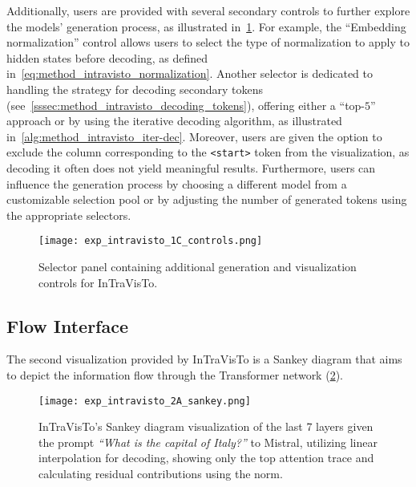 Additionally, users are provided with several secondary controls to further explore the models' generation process, as illustrated in~\cref{fig:exp_intravisto_1_C}.
For example, the ``Embedding normalization'' control allows users to select the type of normalization to apply to hidden states before decoding, as defined in~\cref{eq:method_intravisto_normalization}.
Another selector is dedicated to handling the strategy for decoding secondary tokens (see~\cref{sssec:method_intravisto_decoding_tokens}), offering either a ``top-$5$'' approach or by using the iterative decoding algorithm, as illustrated in~\cref{alg:method_intravisto_iter-dec}.
Moreover, users are given the option to exclude the column corresponding to the \texttt{<start>} token from the visualization, as decoding it often does not yield meaningful results.
Furthermore, users can influence the generation process by choosing a different model from a customizable selection pool or by adjusting the number of generated tokens using the appropriate selectors.

\begin{figure}[t!]
    \centering
    \texttt{[image: exp\_intravisto\_1C\_controls.png]}
    \caption{Selector panel containing additional generation and visualization controls for InTraVisTo.}
    \label{fig:exp_intravisto_1_C}
\end{figure}

\subsection{Flow Interface}\label{ssec:exp_intravisto_exp2}

The second visualization provided by InTraVisTo is a Sankey diagram that aims to depict the information flow through the Transformer network (\cref{fig:exp_intravisto_2_A}).

\begin{figure}[t!]
    \centering
    \texttt{[image: exp\_intravisto\_2A\_sankey.png]}
    \caption[InTraVisTo's Sankey diagram visualization given the prompt \emph{``What is the capital of Italy?''} to Mistral.]{InTraVisTo's Sankey diagram visualization of the last 7 layers given the prompt \emph{``What is the capital of Italy?''} to Mistral, utilizing linear interpolation for decoding, showing only the top attention trace and calculating residual contributions using the norm.}
    \label{fig:exp_intravisto_2_A}
\end{figure}

